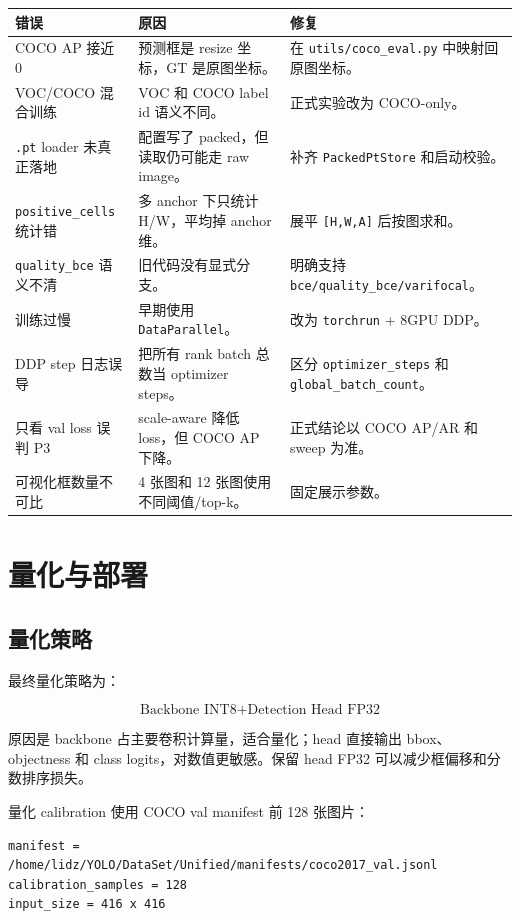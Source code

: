 \documentclass[11pt,a4paper]{article}
\newcommand{\code}[1]{\texttt{#1}}
\begin{document}
\begin{longtable}{p{}p{}p{}}
\toprule
错误 & 原因 & 修复 \\
\midrule
COCO AP 接近 0 & 预测框是 resize 坐标，GT 是原图坐标。 & 在 \code{utils/coco\_eval.py} 中映射回原图坐标。\\
VOC/COCO 混合训练 & VOC 和 COCO label id 语义不同。 & 正式实验改为 COCO-only。\\
\code{.pt} loader 未真正落地 & 配置写了 packed，但读取仍可能走 raw image。 & 补齐 \code{PackedPtStore} 和启动校验。\\
\code{positive\_cells} 统计错 & 多 anchor 下只统计 H/W，平均掉 anchor 维。 & 展平 \code{[H,W,A]} 后按图求和。\\
\code{quality\_bce} 语义不清 & 旧代码没有显式分支。 & 明确支持 \code{bce/quality\_bce/varifocal}。\\
训练过慢 & 早期使用 \code{DataParallel}。 & 改为 \code{torchrun} + 8GPU DDP。\\
DDP step 日志误导 & 把所有 rank batch 总数当 optimizer steps。 & 区分 \code{optimizer\_steps} 和 \code{global\_batch\_count}。\\
只看 val loss 误判 P3 & scale-aware 降低 loss，但 COCO AP 下降。 & 正式结论以 COCO AP/AR 和 sweep 为准。\\
可视化框数量不可比 & 4 张图和 12 张图使用不同阈值/top-k。 & 固定展示参数。\\
\bottomrule
\end{longtable}

\section{量化与部署}

\subsection{量化策略}

最终量化策略为：

\[
\text{Backbone INT8} + \text{Detection Head FP32}
\]

原因是 backbone 占主要卷积计算量，适合量化；head 直接输出 bbox、objectness 和 class logits，对数值更敏感。保留 head FP32 可以减少框偏移和分数排序损失。

量化 calibration 使用 COCO val manifest 前 128 张图片：

\begin{Verbatim}[fontsize=\small]
manifest = /home/lidz/YOLO/DataSet/Unified/manifests/coco2017_val.jsonl
calibration_samples = 128
input_size = 416 x 416
\end{Verbatim}
\end{document}
